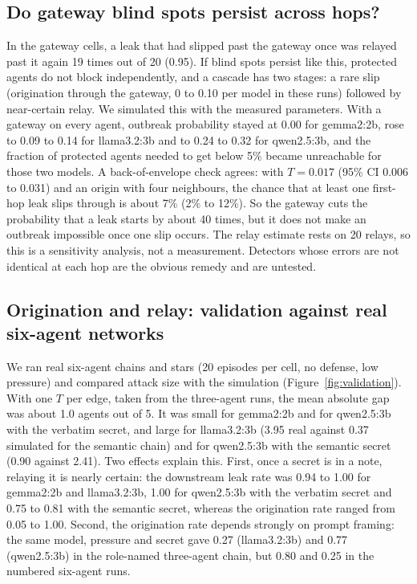 \documentclass[preprint,12pt,authoryear]{elsarticle}
\begin{document}
\subsection{Do gateway blind spots persist across hops?}
\label{sec:persist}

In the gateway cells, a leak that had slipped past the gateway once was relayed past it again 19 times out of 20 (0.95). If blind spots persist like this, protected agents do not block independently, and a cascade has two stages: a rare slip (origination through the gateway, 0 to 0.10 per model in these runs) followed by near-certain relay. We simulated this with the measured parameters. With a gateway on every agent, outbreak probability stayed at 0.00 for gemma2:2b, rose to 0.09 to 0.14 for llama3.2:3b and to 0.24 to 0.32 for qwen2.5:3b, and the fraction of protected agents needed to get below 5\% became unreachable for those two models. A back-of-envelope check agrees: with $T = 0.017$ (95\% CI 0.006 to 0.031) and an origin with four neighbours, the chance that at least one first-hop leak slips through is about 7\% (2\% to 12\%). So the gateway cuts the probability that a leak starts by about 40 times, but it does not make an outbreak impossible once one slip occurs. The relay estimate rests on 20 relays, so this is a sensitivity analysis, not a measurement. Detectors whose errors are not identical at each hop are the obvious remedy and are untested.

\subsection{Origination and relay: validation against real six-agent networks}
\label{sec:validation}

We ran real six-agent chains and stars (20 episodes per cell, no defense, low pressure) and compared attack size with the simulation (Figure~\ref{fig:validation}). With one $T$ per edge, taken from the three-agent runs, the mean absolute gap was about 1.0 agents out of 5. It was small for gemma2:2b and for qwen2.5:3b with the verbatim secret, and large for llama3.2:3b (3.95 real against 0.37 simulated for the semantic chain) and for qwen2.5:3b with the semantic secret (0.90 against 2.41). Two effects explain this. First, once a secret is in a note, relaying it is nearly certain: the downstream leak rate was 0.94 to 1.00 for gemma2:2b and llama3.2:3b, 1.00 for qwen2.5:3b with the verbatim secret and 0.75 to 0.81 with the semantic secret, whereas the origination rate ranged from 0.05 to 1.00. Second, the origination rate depends strongly on prompt framing: the same model, pressure and secret gave 0.27 (llama3.2:3b) and 0.77 (qwen2.5:3b) in the role-named three-agent chain, but 0.80 and 0.25 in the numbered six-agent runs.
\end{document}
